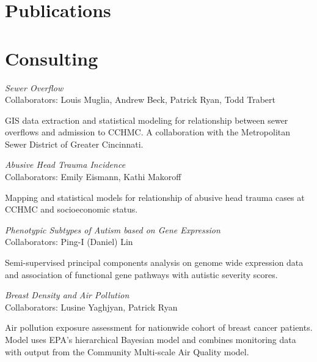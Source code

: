 \documentclass[margin,line]{res}
\newenvironment{list1}{
  \begin{list}{\ding{113}}{%
      \setlength{\itemsep}{0in}
      \setlength{\parsep}{0in} \setlength{\parskip}{0in}
      \setlength{\topsep}{0in} \setlength{\partopsep}{0in} 
      \setlength{\leftmargin}{0.17in}}}{\end{list}}
\begin{document}
\begin{resume}
\section{\sc Publications}


\section{\sc Consulting}

\textsl{Sewer Overflow} \\
Collaborators:  Louis Muglia, Andrew Beck, Patrick Ryan, Todd Trabert\\
\vspace{-0.13in}
\begin{list1}
\item[] GIS data extraction and statistical modeling for relationship between sewer overflows and admission to CCHMC.  A collaboration with the Metropolitan Sewer District of Greater Cincinnati.
\end{list1}

\textsl{Abusive Head Trauma Incidence} \\
Collaborators:  Emily Eismann, Kathi Makoroff\\
\vspace{-0.13in}
\begin{list1}
\item[] Mapping and statistical models for relationship of abusive head trauma cases at CCHMC and socioeconomic status.
\end{list1}

\textsl{Phenotypic Subtypes of Autism based on Gene Expression} \\
Collaborators:  Ping-I (Daniel) Lin\\
\vspace{-0.13in}
\begin{list1}
\item[] Semi-supervised principal components analysis on genome wide expression data and association of functional gene pathways with autistic severity scores.
\end{list1}


\textsl{Breast Density and Air Pollution} \\
Collaborators:  Lusine Yaghjyan, Patrick Ryan\\
\vspace{-0.13in}
\begin{list1}
\item[] Air pollution exposure assessment for nationwide cohort of breast cancer patients.  Model uses EPA's hierarchical Bayesian model and combines monitoring data with output from the Community Multi-scale Air Quality model.
\end{list1}


\end{resume}
\end{document}
